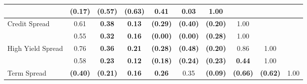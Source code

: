 \documentclass[12pt]{article}
\begin{document}
\begin{table}[H]
\begin{center}
{\begin{tabular}{@{}lccccccccc@{}}
                      & {\color[HTML]{303498} \textbf{(0.17)}} & {\color[HTML]{303498} \textbf{(0.57)}} & {\color[HTML]{303498} \textbf{(0.63)}} & {\color[HTML]{303498} 0.41}            & {\color[HTML]{303498} \textbf{0.03}}   & {\color[HTML]{303498} 1.00}            & \multicolumn{1}{l}{}                   & \multicolumn{1}{l}{}                   & \multicolumn{1}{l}{}                   \\ \midrule
Credit Spread         & 0.61                                   & \textbf{0.38}                          & \textbf{0.13}                          & \textbf{(0.29)}                        & \textbf{(0.40)}                        & \textbf{(0.20)}                        & 1.00                                   & \textbf{}                              & \textbf{}                              \\
                      & {\color[HTML]{303498} 0.55}            & {\color[HTML]{303498} \textbf{0.32}}   & {\color[HTML]{303498} \textbf{0.16}}   & {\color[HTML]{303498} \textbf{(0.00)}} & {\color[HTML]{303498} \textbf{(0.00)}} & {\color[HTML]{303498} \textbf{(0.28)}} & {\color[HTML]{303498} 1.00}            & \multicolumn{1}{l}{}                   & \multicolumn{1}{l}{}                   \\
High Yield Spread     & 0.76                                   & \textbf{0.36}                          & \textbf{0.21}                          & \textbf{(0.28)}                        & \textbf{(0.48)}                        & \textbf{(0.20)}                        & 0.86                                   & 1.00                                   & \textbf{}                              \\
                      & {\color[HTML]{303498} 0.58}            & {\color[HTML]{303498} \textbf{0.23}}   & {\color[HTML]{303498} \textbf{0.12}}   & {\color[HTML]{303498} \textbf{(0.18)}} & {\color[HTML]{303498} \textbf{(0.24)}} & {\color[HTML]{303498} \textbf{(0.23)}} & {\color[HTML]{303498} \textbf{0.44}}   & {\color[HTML]{303498} 1.00}            & \multicolumn{1}{l}{}                   \\
Term Spread           & \textbf{(0.40)}                        & \textbf{(0.21)}                        & \textbf{0.16}                          & \textbf{0.26}                          & 0.35                                   & \textbf{(0.09)}                        & \textbf{(0.66)}                        & \textbf{(0.62)}                        & 1.00                                   \\

\end{tabular}}
\end{center}
\end{table}
\end{document}
